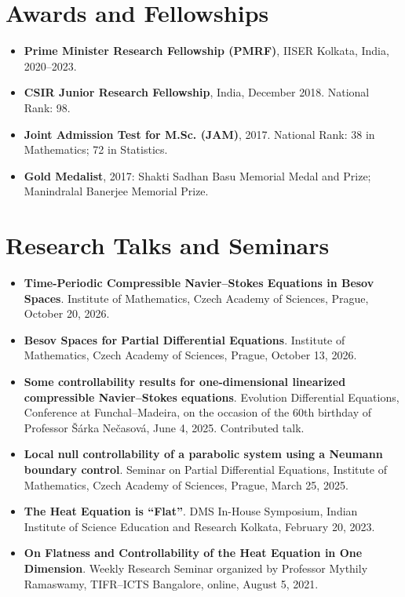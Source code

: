 \documentclass[10pt,a4paper]{article}
\begin{document}
\section*{Awards and Fellowships}
\begin{itemize}
    \item \textbf{Prime Minister Research Fellowship (PMRF)}, IISER Kolkata, India, 2020--2023.
    \item \textbf{CSIR Junior Research Fellowship}, India, December 2018. National Rank: 98.
    \item \textbf{Joint Admission Test for M.Sc. (JAM)}, 2017. National Rank: 38 in Mathematics; 72 in Statistics.
    \item \textbf{Gold Medalist}, 2017: Shakti Sadhan Basu Memorial Medal and Prize; Manindralal Banerjee Memorial Prize.
\end{itemize}

\section*{Research Talks and Seminars}
\begin{itemize}
    \item \textbf{Time-Periodic Compressible Navier--Stokes Equations in Besov Spaces}. Institute of Mathematics, Czech Academy of Sciences, Prague, October 20, 2026.
    \item \textbf{Besov Spaces for Partial Differential Equations}. Institute of Mathematics, Czech Academy of Sciences, Prague, October 13, 2026.
    \item \textbf{Some controllability results for one-dimensional linearized compressible Navier--Stokes equations}. Evolution Differential Equations, Conference at Funchal--Madeira, on the occasion of the 60th birthday of Professor \v{S}\'arka Ne\v{c}asov\'a, June 4, 2025. Contributed talk.
    \item \textbf{Local null controllability of a parabolic system using a Neumann boundary control}. Seminar on Partial Differential Equations, Institute of Mathematics, Czech Academy of Sciences, Prague, March 25, 2025.
    \item \textbf{The Heat Equation is ``Flat''}. DMS In-House Symposium, Indian Institute of Science Education and Research Kolkata, February 20, 2023.
    \item \textbf{On Flatness and Controllability of the Heat Equation in One Dimension}. Weekly Research Seminar organized by Professor Mythily Ramaswamy, TIFR--ICTS Bangalore, online, August 5, 2021.
\end{itemize}
\end{document}
